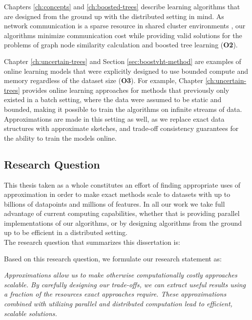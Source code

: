Chapters \ref{ch:concepts} and \ref{ch:boosted-trees} describe learning algorithms that
are designed from the ground up with the distributed setting in mind. As network
communication is a sparse resource in shared cluster environments \cite{optimization-communication-complexity},
our algorithms minimize communication cost while providing valid
solutions for the problems of graph node similarity calculation and
boosted tree learning (\textbf{O2}).

Chapter \ref{ch:uncertain-trees} and Section \ref{sec:boostvht-method}
are examples of online learning models
that were explicitly designed to use bounded compute and memory regardless of the
dataset size (\textbf{O3}). For example, Chapter \ref{ch:uncertain-trees} provides online learning approaches
for methods that previously only existed in a batch setting, where the data were assumed to be
static and bounded, making it possible to train the algorithms on infinite streams of
data. Approximations are made in this setting as well,
as we replace exact data structures with approximate sketches, and trade-off consistency
guarantees for the ability to train the models online.


\subsection{Research Question}

This thesis taken as a whole constitutes an effort of finding appropriate
uses of approximation in order to make exact methods scale to datasets
with up to billions of datapoints and millions of features.
In all our work we take full advantage of current computing
capabilities,
whether that is providing parallel implementations of our algorithms,
or by designing algorithms from the
ground up to be efficient in a distributed setting.\\

\noindent
The research question that summarizes this dissertation is:

\begin{displayquote}
	\researchQuestion
\end{displayquote}

\noindent
Based on this research question, we formulate our research statement as:

\begin{displayquote}
	\emph{Approximations allow us to make otherwise computationally costly approaches scalable.
	By carefully designing our trade-offs, we can extract useful results using a fraction
	of the resources exact approaches require. These approximations combined with utilizing parallel and distributed computation lead to efficient, scalable solutions.}
\end{displayquote}

